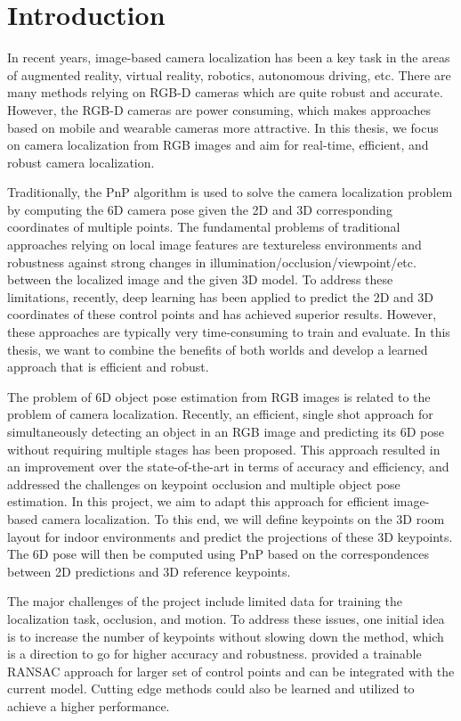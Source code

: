 \chapter{Introduction}

In recent years, image-based camera localization has been a key task in the areas of augmented reality, virtual reality, robotics, autonomous driving, etc. There are many methods relying on RGB-D cameras which are quite robust and accurate. However, the RGB-D cameras are power consuming, which makes approaches based on mobile and wearable cameras more attractive. In this thesis, we focus on camera localization from RGB images and aim for real-time, efficient, and robust camera localization.

Traditionally, the PnP algorithm \cite{lepetit2009epnp} is used to solve the camera localization problem by computing the 6D camera pose given the 2D and 3D corresponding coordinates of multiple points. The fundamental problems of traditional approaches relying on local image features are textureless environments and robustness against strong changes in illumination/occlusion/viewpoint/etc. between the localized image and the given 3D model. To address these limitations, recently, deep learning has been applied to predict the 2D and 3D coordinates of these control points \cite{brachmann2017dsac} and has achieved superior results. However, these approaches are typically very time-consuming to train and evaluate. In this thesis, we want to combine the benefits of both worlds and develop a learned approach that is efficient and robust.

The problem of 6D object pose estimation from RGB images is related to the problem of camera localization. Recently, an efficient, single shot approach for simultaneously detecting an object in an RGB image and predicting its 6D pose without requiring multiple stages \cite{tekin2018real} has been proposed. This approach resulted in an improvement over the state-of-the-art in terms of accuracy and efficiency, and addressed the challenges on keypoint occlusion and multiple object pose estimation. In this project, we aim to adapt this approach for efficient image-based camera localization. To this end, we will define keypoints on the 3D room layout for indoor environments and predict the projections of these 3D keypoints. The 6D pose will then be computed using PnP \cite{lepetit2009epnp} based on the correspondences between 2D predictions and 3D reference keypoints.

The major challenges of the project include limited data for training the localization task, occlusion, and motion. To address these issues, one initial idea is to increase the number of keypoints without slowing down the method, which is a direction to go for higher accuracy and robustness. \cite{brachmann2017dsac} provided a trainable RANSAC approach for larger set of control points and can be integrated with the current model. Cutting edge methods could also be learned and utilized to achieve a higher performance.


